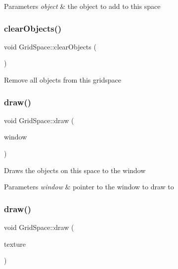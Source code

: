 \begin{DoxyParams}{Parameters}
{\em object} & the object to add to this space \\
\hline
\end{DoxyParams}
\mbox{\label{classGridSpace_afe6e2ac48c9643732639f0ab2be5e997}} 
\subsubsection{\texorpdfstring{clear\+Objects()}{clearObjects()}}
{\footnotesize\ttfamily void Grid\+Space\+::clear\+Objects (\begin{DoxyParamCaption}{ }\end{DoxyParamCaption})}

Remove all objects from this gridspace \mbox{\label{classGridSpace_a5c075b8354b80be59475211edb92d48b}} 
\subsubsection{\texorpdfstring{draw()}{draw()}\hspace{0.1cm}{\footnotesize\ttfamily [1/2]}}
{\footnotesize\ttfamily void Grid\+Space\+::draw (\begin{DoxyParamCaption}\item[{sf\+::\+Render\+Window \&}]{window }\end{DoxyParamCaption})}

Draws the objects on this space to the window


\begin{DoxyParams}{Parameters}
{\em window} & pointer to the window to draw to \\
\hline
\end{DoxyParams}
\mbox{\label{classGridSpace_a84e4bb348f957ca3e6542cd2a333177c}} 
\subsubsection{\texorpdfstring{draw()}{draw()}\hspace{0.1cm}{\footnotesize\ttfamily [2/2]}}
{\footnotesize\ttfamily void Grid\+Space\+::draw (\begin{DoxyParamCaption}\item[{sf\+::\+Render\+Texture \&}]{texture }\end{DoxyParamCaption})}

